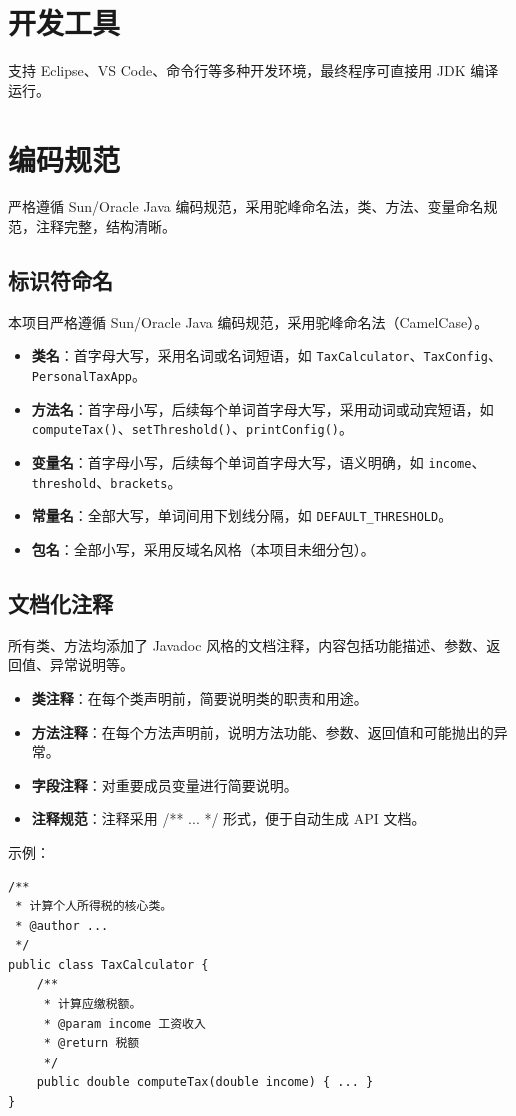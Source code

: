 \section{开发工具}
支持 Eclipse、VS Code、命令行等多种开发环境，最终程序可直接用 JDK 编译运行。
\section{编码规范}
严格遵循 Sun/Oracle Java 编码规范，采用驼峰命名法，类、方法、变量命名规范，注释完整，结构清晰。
\subsection{标识符命名}
本项目严格遵循 Sun/Oracle Java 编码规范，采用驼峰命名法（CamelCase）。
\begin{itemize}
	\item \textbf{类名}：首字母大写，采用名词或名词短语，如 \texttt{TaxCalculator}、\texttt{TaxConfig}、\texttt{PersonalTaxApp}。
	\item \textbf{方法名}：首字母小写，后续每个单词首字母大写，采用动词或动宾短语，如 \texttt{computeTax()}、\texttt{setThreshold()}、\texttt{printConfig()}。
	\item \textbf{变量名}：首字母小写，后续每个单词首字母大写，语义明确，如 \texttt{income}、\texttt{threshold}、\texttt{brackets}。
	\item \textbf{常量名}：全部大写，单词间用下划线分隔，如 \texttt{DEFAULT\_THRESHOLD}。
	\item \textbf{包名}：全部小写，采用反域名风格（本项目未细分包）。
\end{itemize}
\subsection{文档化注释}
所有类、方法均添加了 Javadoc 风格的文档注释，内容包括功能描述、参数、返回值、异常说明等。
\begin{itemize}
	\item \textbf{类注释}：在每个类声明前，简要说明类的职责和用途。
	\item \textbf{方法注释}：在每个方法声明前，说明方法功能、参数、返回值和可能抛出的异常。
	\item \textbf{字段注释}：对重要成员变量进行简要说明。
	\item \textbf{注释规范}：注释采用 /** ... */ 形式，便于自动生成 API 文档。
\end{itemize}
示例：
\begin{lstlisting}[style=cleanjava]
/**
 * 计算个人所得税的核心类。
 * @author ...
 */
public class TaxCalculator {
	/**
	 * 计算应缴税额。
	 * @param income 工资收入
	 * @return 税额
	 */
	public double computeTax(double income) { ... }
}
\end{lstlisting}
